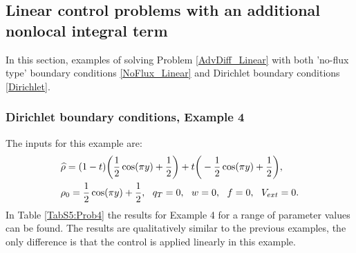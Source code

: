 

\subsection{Linear control problems with an additional nonlocal integral term}
In this section, examples of solving Problem \eqref{AdvDiff_Linear} with both 'no-flux type' boundary conditions \eqref{NoFlux_Linear} and Dirichlet boundary conditions \eqref{Dirichlet}.
\subsubsection{Dirichlet boundary conditions, Example 4}
The inputs for this example are:
\begin{align*}
&\widehat \rho = (1 - t)\bigg(\frac{1}{2}\cos(\pi y) + \frac{1}{2}\bigg)  + t\bigg(-\frac{1}{2}\cos(\pi y) + \frac{1}{2}\bigg),\\
&\rho_{0} = \frac{1}{2}\cos(\pi y) + \frac{1}{2},\ \
q_{T} = 0,\ \
{w} = 0,\ \
f =0, \ \
V_{ext} =0.
\end{align*}
In Table \ref{TabS5:Prob4} the results for Example 4 for a range of parameter values can be found. The results are qualitatively similar to the previous examples, the only difference is that the control is applied linearly in this example.

